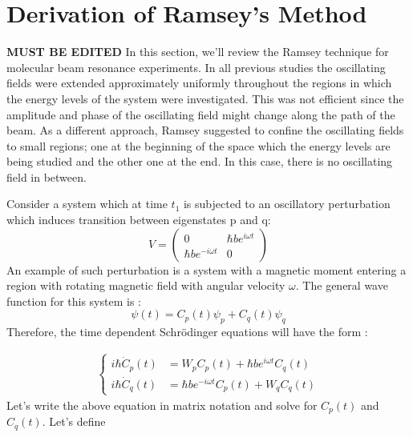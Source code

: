 \chapter{Derivation of Ramsey's Method}
\textbf{MUST BE EDITED} In this section, we'll review the Ramsey
technique for molecular beam resonance experiments. In all previous
studies the oscillating fields were extended approximately uniformly
throughout the regions in which the energy levels of the system were
investigated. This was not efficient since the amplitude and phase of
the oscillating field might change along the path of the beam. As a
different approach, Ramsey suggested to confine the oscillating fields
to small regions; one at the beginning of the space which the energy
levels are being studied and the other one at the end. In this case,
there is no oscillating field in between.

Consider a system which at time $t_1$ is subjected to an oscillatory
perturbation which induces transition between eigenstates p and q:
\begin{equation}
V=
\left(
\begin{array}{cc}
0 & \hbar b e^{i\omega t} \\ 
\hbar b e^{-i \omega t} & 0
\end{array} 
\right)
\end{equation}
An example of such perturbation is a system with a magnetic moment
entering a region with rotating magnetic field with angular velocity
$\omega$. The general wave function for this system is :
\begin{equation}
\psi(t)= C_p (t) \psi_p + C_q(t) \psi_q
\end{equation}
Therefore, the time dependent Schr\"{o}dinger equations will have the
form :

\begin{align}
\left\lbrace
\begin{array}{cc}
i \hbar \dot{C}_p(t)&= W_p C_p(t)+\hbar b e^{i \omega t} C_q(t) \\
i \hbar \dot{C}_q(t)&=\hbar b e^{-i \omega t} C_p(t) +W_q C_q(t)
\end{array}
\right.
\end{align}
Let's write the above equation in matrix notation and solve for
$C_p(t)$ and $C_q(t)$. Let's define

